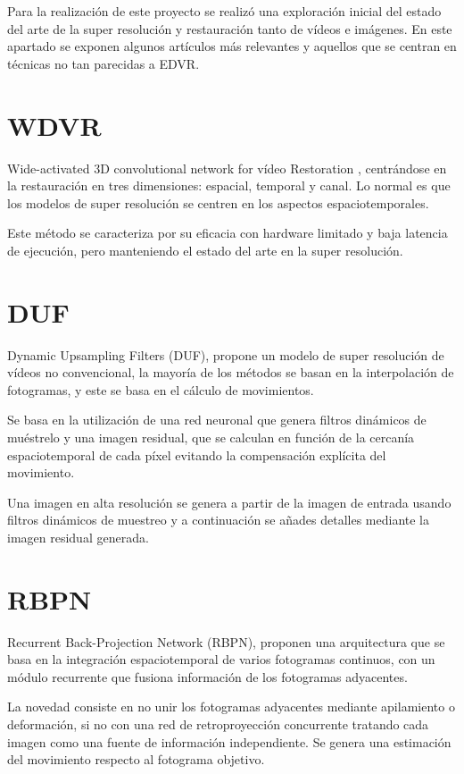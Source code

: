 
Para la realización de este proyecto se realizó una exploración inicial del estado del arte de la super resolución y restauración tanto de vídeos e imágenes. En este apartado se exponen algunos artículos más relevantes y aquellos que se centran en técnicas no tan parecidas a EDVR.

\section{WDVR}  
Wide-activated 3D convolutional network for vídeo Restoration \cite{9025696}, centrándose en la restauración  en tres dimensiones: espacial, temporal y canal. Lo normal es que los modelos de super resolución se centren en los aspectos espaciotemporales.

Este método se caracteriza por su eficacia con hardware limitado y baja latencia de ejecución, pero manteniendo el estado del arte en la super resolución. 

\section{DUF}  
Dynamic Upsampling Filters (DUF)\cite{8578438}, propone un modelo de super resolución de vídeos no convencional, la mayoría de los métodos se basan en la interpolación de fotogramas, y este se basa en el cálculo de movimientos. 

Se basa en la utilización de una red neuronal que genera filtros dinámicos de muéstrelo y una imagen residual, que se calculan en función de la cercanía espaciotemporal de cada píxel evitando la compensación explícita del movimiento.

Una imagen en alta resolución se genera a partir de la imagen de entrada usando filtros dinámicos de muestreo y a continuación se añades detalles mediante la imagen residual generada.

\section{RBPN}
Recurrent Back-Projection Network (RBPN)\cite{haris2019recurrent}, proponen una arquitectura que se basa en la integración espaciotemporal de varios fotogramas continuos, con un módulo recurrente que fusiona información de los fotogramas adyacentes.

La novedad consiste en no unir los fotogramas adyacentes mediante apilamiento o deformación, si  no con una red de retroproyección concurrente  tratando cada imagen como una fuente de información independiente. Se genera una estimación del movimiento respecto al fotograma objetivo. 

